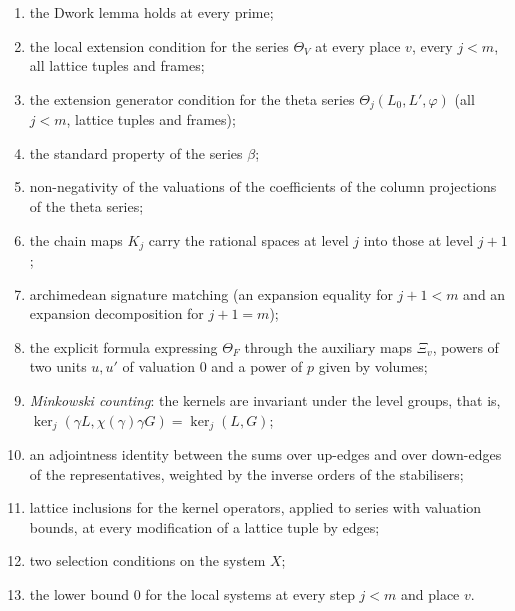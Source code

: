 \begin{enumerate}[label=(A\arabic*)]
\item\label{pf:reckernel:A1} the Dwork lemma holds at every prime;
\item\label{pf:reckernel:A2} the local extension condition for the series $\Theta_V$ at every place $v$, every $j<m$, all
  lattice tuples and frames;
\item\label{pf:reckernel:A3} the extension generator condition for the theta series $\Theta_j(L_0,L',\varphi)$ (all
  $j<m$, lattice tuples and frames);
\item\label{pf:reckernel:A4} the standard property of the series $\beta$;
\item\label{pf:reckernel:A5} non-negativity of the valuations of the coefficients of the column projections of the theta
  series;
\item\label{pf:reckernel:A6} the chain maps $K_j$ carry the rational spaces at level $j$ into those at level $j+1$;
\item\label{pf:reckernel:A7} archimedean signature matching (an expansion equality for $j+1<m$ and an expansion
  decomposition for $j+1=m$);
\item\label{pf:reckernel:A8} the explicit formula expressing $\Theta_F$ through the auxiliary maps $\Xi_v$, powers of two
  units $u,u'$ of valuation $0$ and a power of $p$ given by volumes;
\item\label{pf:reckernel:A9} \emph{Minkowski counting}: the kernels are invariant under the level groups, that is,
  $\ker_j(\gamma L,\chi(\gamma)\gamma G)=\ker_j(L,G)$;
\item\label{pf:reckernel:A10} an adjointness identity between the sums over up-edges and over down-edges of the
  representatives, weighted by the inverse orders of the stabilisers;
\item\label{pf:reckernel:A11} lattice inclusions for the kernel operators, applied to series with valuation bounds, at
  every modification of a lattice tuple by edges;
\item\label{pf:reckernel:A12} two selection conditions on the system $X$;
\item\label{pf:reckernel:A13} the lower bound $0$ for the local systems at every step $j<m$ and place $v$.
\end{enumerate}

